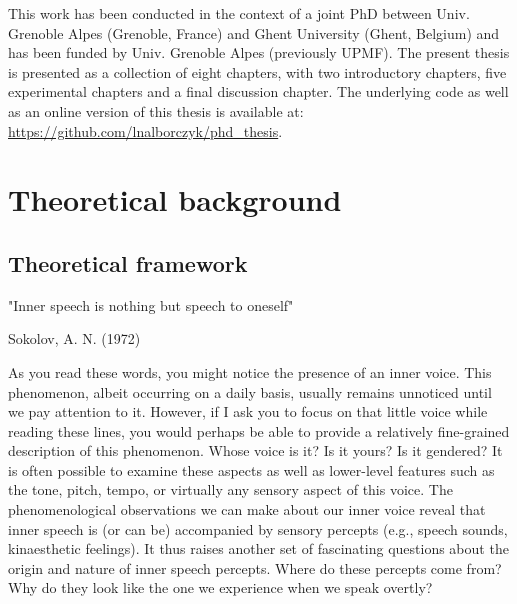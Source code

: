 \documentclass[a4paper,12pt,twoside,onecolumn,openright,final,oldfontcommands]{memoir}
\newcommand{\initial}[1]{
	\lettrine[lines=3,lhang=0.33,nindent=0em]{
		\color{gray}
     		{\textsc{#1}}}{}}
\newcommand{\clearemptydoublepage}{\newpage{\thispagestyle{empty}\cleardoublepage}}
\begin{document}
\initial{T}his work has been conducted in the context of a joint PhD between Univ. Grenoble Alpes (Grenoble, France) and Ghent University (Ghent, Belgium) and has been funded by Univ. Grenoble Alpes (previously UPMF). The present thesis is presented as a collection of eight chapters, with two introductory chapters, five experimental chapters and a final discussion chapter. The underlying code as well as an online version of this thesis is available at: \url{https://github.com/lnalborczyk/phd_thesis}.

\clearemptydoublepage

\renewcommand{\contentsname}{Table of contents}
\tableofcontents*
{}
\newpage

\listoftables
{}
\newpage

\listoffigures
{}
\newpage


\hypertarget{part-theoretical-background}{%
\part{Theoretical background}\label{part-theoretical-background}}

\sloppy 

\hypertarget{intro}{%
\chapter{Theoretical framework}\label{intro}}

\epigraph{"Inner speech is nothing but speech to oneself"}{Sokolov, A. N. (1972)}

\initial{A}s you read these words, you might notice the presence of an inner voice. This phenomenon, albeit occurring on a daily basis, usually remains unnoticed until we pay attention to it. However, if I ask you to focus on that little voice while reading these lines, you would perhaps be able to provide a relatively fine-grained description of this phenomenon. Whose voice is it? Is it yours? Is it gendered? It is often possible to examine these aspects as well as lower-level features such as the tone, pitch, tempo, or virtually any sensory aspect of this voice. The phenomenological observations we can make about our inner voice reveal that inner speech is (or can be) accompanied by sensory percepts (e.g., speech sounds, kinaesthetic feelings). It thus raises another set of fascinating questions about the origin and nature of inner speech percepts. Where do these percepts come from? Why do they look like the one we experience when we speak overtly?
\end{document}
